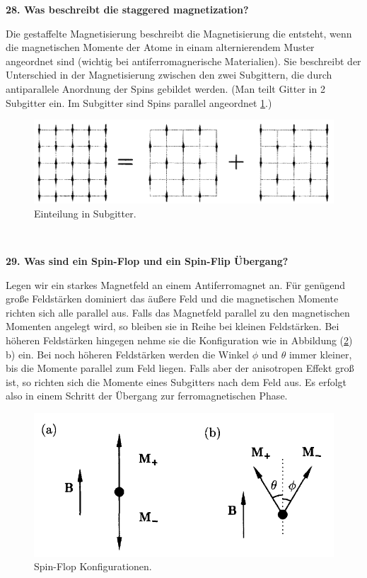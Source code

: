 \noindent\textbf{28. Was beschreibt die \glqq staggered magnetization\grqq ?}\\
\begin{addmargin}[25pt]{0pt}
Die gestaffelte Magnetisierung beschreibt die Magnetisierung die entsteht, wenn die magnetischen Momente der Atome in einam alternierendem Muster angeordnet sind (wichtig bei antiferromagnerische Materialien). Sie beschreibt der Unterschied in der Magnetisierung zwischen den zwei Subgittern, die durch antiparallele Anordnung der Spins gebildet werden. (Man teilt Gitter in 2 Subgitter ein. Im Subgitter sind Spins parallel angeordnet \ref{fig:gestaffelt}.)
\begin{figure}
    \centering
    \includegraphics[scale=0.5]{images/KM2/gestaffelt.png}
    \caption{Einteilung in Subgitter.}
    \label{fig:gestaffelt}
\end{figure}\\
\end{addmargin}

\noindent\textbf{29. Was sind ein \glqq Spin-Flop\grqq\; und ein \glqq Spin-Flip\grqq \; Übergang?}\\
\begin{addmargin}[25pt]{0pt}
Legen wir ein starkes Magnetfeld an einem Antiferromagnet an. Für genügend große Feldstärken dominiert das äußere Feld und die magnetischen Momente richten sich alle parallel aus. Falls das Magnetfeld parallel zu den magnetischen Momenten angelegt wird, so bleiben sie in Reihe bei kleinen Feldstärken. Bei höheren Feldstärken hingegen nehme sie die Konfiguration wie in Abbildung (\ref{fig:Spin-Flop}) b) ein. Bei noch höheren Feldstärken werden die Winkel $\phi$ und $\theta$ immer kleiner, bis die Momente parallel zum Feld liegen. Falls aber der anisotropen Effekt groß ist, so richten sich die Momente eines Subgitters nach dem Feld aus. Es erfolgt also in einem Schritt der Übergang zur ferromagnetischen Phase.\\
\begin{figure}
    \centering
    \includegraphics[scale=0.7]{images/KM2/Spin-Flop.png}
    \caption{Spin-Flop Konfigurationen.}
    \label{fig:Spin-Flop}
\end{figure}
\end{addmargin}

